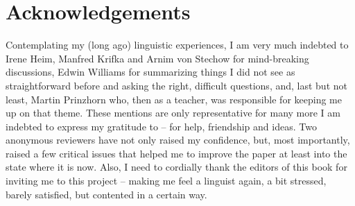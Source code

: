 \documentclass[output=paper,colorlinks,citecolor=brown,
]{langscibook}
\begin{document}
\section*{Acknowledgements}

Contemplating my (long ago) linguistic experiences, I am
very much indebted to Irene Heim, Manfred Krifka and Arnim von Stechow for mind-breaking discussions,
Edwin Williams for summarizing things I did not see as straightforward before and asking the right, difficult
questions, and, last but not least, Martin Prinzhorn who, then as a teacher, was responsible for keeping me up on that
theme. These mentions are only representative for many more I am indebted to express my gratitude to -- for help,
friendship and ideas. Two anonymous reviewers have not only raised my confidence, but, most importantly, raised a few
critical issues that helped me to improve the paper at least into the state where it is now. Also, I need to cordially thank the
editors of this book for inviting me to this project -- making
me feel a linguist again, a bit stressed, barely satisfied, but contented in a certain way.




\printbibliography[heading=subbibliography,notkeyword=this]
\end{document}
